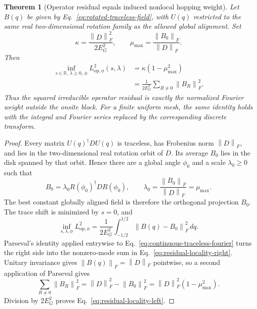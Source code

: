 \documentclass[11pt]{article}
\newcommand{\norm}[1]{\left\lVert #1\right\rVert}
\newtheorem{theorem}{Theorem}
\begin{document}
\begin{theorem}[Operator residual equals induced nonlocal hopping weight]
\label{thm:residual-locality-identity}
Let $B(q)$ be given by Eq.~\eqref{eq:rotated-traceless-field}, with $U(q)$ restricted to
the same real two-dimensional rotation family as the allowed global alignment. Set
\begin{equation}
 \kappa=\frac{\norm{D}_F^2}{2E_G^2},
 \qquad
 \mu_{\max}=\frac{\norm{B_0}_F}{\norm{D}_F}.
 \label{eq:locality-kappa-mu}
\end{equation}
Then
\begin{align}
 \inf_{s\in\mathbb R,\,\lambda\ge0,\,\phi}
 L_{\mathrm{op},\phi}^2(s,\lambda)
 &=\kappa(1-\mu_{\max}^2)
 \label{eq:residual-locality-left}\\
 &=\frac{1}{2E_G^2}
   \sum_{R\ne0}\norm{B_R}_F^2.
 \label{eq:residual-locality-right}
\end{align}
Thus the squared irreducible operator residual is exactly the normalized Fourier weight
outside the onsite block. For a finite uniform mesh, the same identity holds with the
integral and Fourier series replaced by the corresponding discrete transform.
\end{theorem}

\begin{proof}
Every matrix $U(q)^\dagger D U(q)$ is traceless, has Frobenius norm $\norm D_F$, and lies
in the two-dimensional real rotation orbit of $D$. Its average $B_0$ lies in the disk
spanned by that orbit. Hence there are a global angle $\phi_0$ and a scale
$\lambda_0\ge0$ such that
\[
 B_0=\lambda_0R(\phi_0)^\dagger D R(\phi_0),
 \qquad
 \lambda_0=\frac{\norm{B_0}_F}{\norm{D}_F}=\mu_{\max}.
\]
The best constant globally aligned field is therefore the orthogonal projection $B_0$.
The trace shift is minimized by $s=0$, and
\begin{equation}
 \inf_{s,\lambda,\phi}L_{\mathrm{op},\phi}^2
 =\frac{1}{2E_G^2}
  \int_{-1/2}^{1/2}\norm{B(q)-B_0}_F^2\,dq.
 \label{eq:mean-field-residual}
\end{equation}
Parseval's identity applied entrywise to
Eq.~\eqref{eq:continuous-traceless-fourier} turns the right side into the nonzero-mode
sum in Eq.~\eqref{eq:residual-locality-right}. Unitary invariance gives
$\norm{B(q)}_F=\norm{D}_F$ pointwise, so a second application of Parseval gives
\[
 \sum_{R\ne0}\norm{B_R}_F^2
 =\norm D_F^2-\norm{B_0}_F^2
 =\norm D_F^2(1-\mu_{\max}^2).
\]
Division by $2E_G^2$ proves Eq.~\eqref{eq:residual-locality-left}.
\end{proof}
\end{document}
